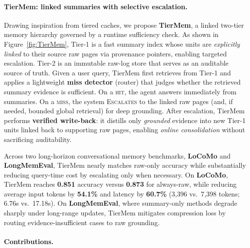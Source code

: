 \documentclass{article}
\theoremstyle{plain}
\theoremstyle{definition}
\theoremstyle{remark}
\begin{document}
\paragraph{TierMem: linked summaries with selective escalation.}
Drawing inspiration from tiered caches, we propose \textbf{TierMem}, a linked two-tier memory hierarchy governed by a runtime sufficiency check.
As shown in Figure~\ref{fig:TierMem}, Tier-1 is a fast summary index whose units are \emph{explicitly linked} to their source raw pages via provenance pointers, enabling targeted escalation.
Tier-2 is an immutable raw-log store that serves as an auditable source of truth.
Given a user query, TierMem first retrieves from Tier-1 and applies a lightweight \textbf{miss detector} (router) that judges whether the retrieved summary evidence is sufficient.
On a \textsc{hit}, the agent answers immediately from summaries.
On a \textsc{miss}, the system \textsc{Escalates} to the linked raw pages (and, if needed, bounded global retrieval) for deep grounding.
After escalation, TierMem performs \textbf{verified write-back}: it distills only \emph{grounded} evidence into new Tier-1 units linked back to supporting raw pages, enabling \emph{online consolidation} without sacrificing auditability.

Across two long-horizon conversational memory benchmarks, \textbf{LoCoMo} and \textbf{LongMemEval}, TierMem nearly matches raw-only accuracy while substantially reducing query-time cost by escalating only when necessary.
On \textbf{LoCoMo}, TierMem reaches \textbf{0.851} accuracy versus \textbf{0.873} for always-raw, while reducing average input tokens by \textbf{54.1\%} and latency by \textbf{60.7\%} (3{,}396 vs.\ 7{,}398 tokens; 6.76s vs.\ 17.18s).
On \textbf{LongMemEval}, where summary-only methods degrade sharply under long-range updates, TierMem mitigates compression loss by routing evidence-insufficient cases to raw grounding.

\paragraph{Contributions.}
\end{document}
